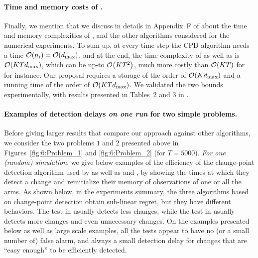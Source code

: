 \paragraph{Time and memory costs of \GLRklUCB.}
%
Finally, we mention that we discuss in details in Appendix~F of \cite{Besson2019GLRT} about the time and memory complexities of \GLRklUCB, and the other algorithms considered for the numerical experiments.
%
To sum up, at every time step the CPD algorithm needs a time $\mathop{}\mathopen{}\mathcal{O}\mathopen{}\left(n_i\right)=\mathop{}\mathopen{}\mathcal{O}\mathopen{}\left(d_{\max}\right)$, and at the end, the time complexity of \CUSUMklUCB{} as well as \GLRklUCB{} is $\mathop{}\mathopen{}\mathcal{O}\mathopen{}\left(K T d_{\max}\right)$, which can be up-to $\mathop{}\mathopen{}\mathcal{O}\mathopen{}\left(K T^2\right)$, much more costly than $\mathop{}\mathopen{}\mathcal{O}\mathopen{}\left(K T\right)$ for \klUCB{} for instance.
%
Our proposal \GLRklUCB{} requires a storage of the order of $\mathop{}\mathopen{}\mathcal{O}\mathopen{}\left(K d_{\max}\right)$ and a running time of the order of $\mathop{}\mathopen{}\mathcal{O}\mathopen{}\left(K T d_{\max}\right)$.
We validated the two bounds experimentally, with results presented in Tables~2 and 3 in \cite{Besson2019GLRT}.


%


\paragraph{Examples of detection delays \emph{on one run} for two simple problems.}

Before giving larger results that compare our approach against other algorithms, we consider the two problems $1$ and $2$ presented above in Figures~\ref{fig:6:Problem_1} and \ref{fig:6:Problem_2} (for $T=5000$).
\emph{For one (random) simulation}, we give below examples of the efficiency of the change-point detection algorithm used by \GLRklUCB{} as well as \CUSUMklUCB{} and \MklUCB,
by showing the times at which they detect a change and reinitialize their memory of observations of one or all the arms.
As shown below, in the experiments summary, the three algorithms based on change-point detection obtain sub-linear regret, but they have different behaviors.
The test in \MUCB{} usually detects less changes, while the test in \CUSUMUCB{} usually detects more changes and even unnecessary changes.
%
On the examples presented below as well as large scale examples, all the tests appear to have no (or a small number of) false alarm, and always a small detection delay for changes that are ``easy enough'' to be efficiently detected.

